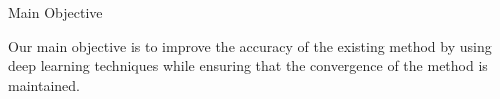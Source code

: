 \begin{frame}{Main Objective}
    
    Our main objective is to improve the accuracy of the existing method by using deep learning techniques
    while ensuring that the convergence of the method is maintained. 

\end{frame}